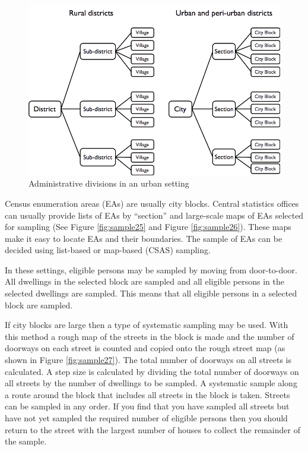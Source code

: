 \documentclass[12pt,a4paper]{book}
\theoremstyle{definition}
\theoremstyle{definition}
\theoremstyle{definition}
\theoremstyle{remark}
\begin{document}
\begin{figure}[H]

{\centering \includegraphics[width=800pt]{figures/stage2sample10} 

}

\caption{Administrative divisions in an urban setting}\label{fig:sample24}
\end{figure}

Census enumeration areas (EAs) are usually city blocks. Central
statistics offices can usually provide lists of EAs by ``section'' and
large-scale maps of EAs selected for sampling (See Figure
\ref{fig:sample25} and Figure \ref{fig:sample26}). These maps make it
easy to locate EAs and their boundaries. The sample of EAs can be
decided using list-based or map-based (CSAS) sampling.

In these settings, eligible persons may be sampled by moving from
door-to-door. All dwellings in the selected block are sampled and all
eligible persons in the selected dwellings are sampled. This means that
all eligible persons in a selected block are sampled.

If city blocks are large then a type of systematic sampling may be used.
With this method a rough map of the streets in the block is made and the
number of doorways on each street is counted and copied onto the rough
street map (as shown in Figure \ref{fig:sample27}). The total number of
doorways on all streets is calculated. A step size is calculated by
dividing the total number of doorways on all streets by the number of
dwellings to be sampled. A systematic sample along a route around the
block that includes all streets in the block is taken. Streets can be
sampled in any order. If you find that you have sampled all streets but
have not yet sampled the required number of eligible persons then you
should return to the street with the largest number of houses to collect
the remainder of the sample.
\end{document}
